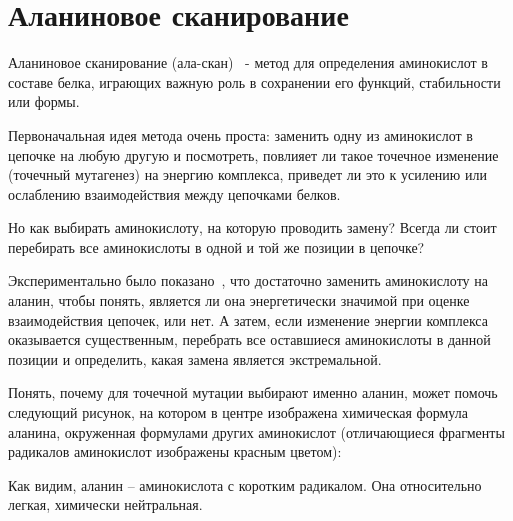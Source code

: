\section{Аланиновое сканирование}
Аланиновое сканирование (ала-скан)~\cite{alascan2001} - метод для определения аминокислот в составе белка, играющих важную роль в сохранении его функций, стабильности или формы.

Первоначальная идея метода очень проста: заменить одну из аминокислот в цепочке на любую другую и посмотреть, повлияет ли такое точечное изменение (точечный мутагенез) на энергию комплекса, приведет ли это к усилению или ослаблению взаимодействия между цепочками белков. 

Но как выбирать аминокислоту, на которую проводить замену? Всегда ли стоит перебирать все аминокислоты в одной и той же позиции в цепочке?

Экспериментально было показано~\cite{alascan2001}, что достаточно заменить аминокислоту на аланин, чтобы понять, является ли она энергетически значимой при оценке взаимодействия цепочек, или нет. А затем, если изменение энергии комплекса \ddG\,  оказывается существенным, перебрать все оставшиеся аминокислоты в данной позиции и определить, какая замена является экстремальной.

Понять, почему для точечной мутации выбирают именно аланин, может помочь следующий рисунок, на котором в центре изображена химическая формула аланина, окруженная формулами других аминокислот (отличающиеся фрагменты радикалов аминокислот изображены красным цветом):

\begin{center}
 \resizebox{0.4\textheight}{!}{
 \ttfamily
 \footnotesize
 \aapicture
 }
\end{center}

Как видим, аланин -- аминокислота с коротким радикалом. Она относительно легкая, химически нейтральная. 

